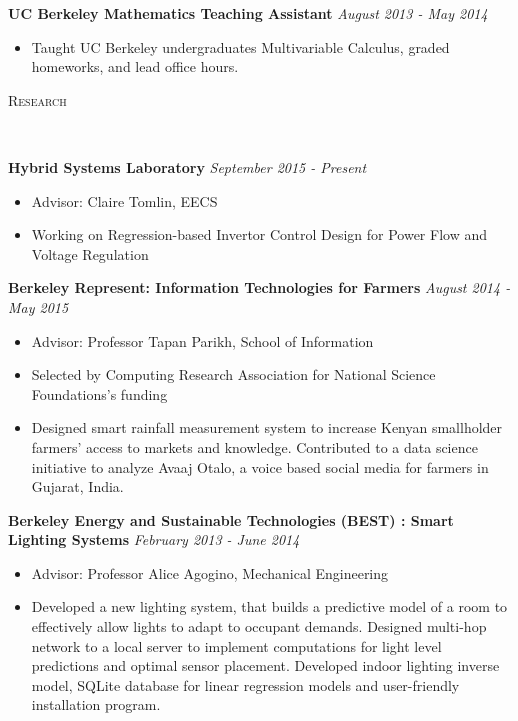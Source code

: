 \documentclass[9pt]{extarticle}
\newenvironment{changemargin}[2]{%
  \begin{list}{}{%
    \setlength{\topsep}{0pt}%
    \setlength{\leftmargin}{#1}%
    \setlength{\rightmargin}{#2}%
    \setlength{\listparindent}{\parindent}%
    \setlength{\itemindent}{\parindent}%
    \setlength{\parsep}{\parskip}%
  }%
  \item[]}{\end{list}
}
\newcommand{\lineover}{
	\begin{changemargin}{-0.05in}{-0.05in}
		\vspace*{-8pt}
		\hrulefill \\
		\vspace*{-2pt}
	\end{changemargin}
}
\newcommand{\header}[1]{
    \vspace{5pt}
	\begin{changemargin}{-0.5in}{-0.5in}
		\scshape{#1}\\
  	\lineover
	\end{changemargin}
	\vspace{5pt}
}
\newenvironment{body} {
	\vspace*{-9pt}
	\begin{changemargin}{-0.5in}{-0.5in}
  }	
	{\end{changemargin}
}
\begin{document}
\begin{body}
	\textbf{UC Berkeley Mathematics Teaching Assistant} 
	 \hfill \emph{August 2013 - May 2014}\\
	\vspace*{-6pt}
	\begin{itemize} \itemsep -0pt  %
		\item[] Taught UC Berkeley undergraduates Multivariable Calculus, graded homeworks, and lead office hours.
	\end{itemize}	
\end{body}

\vspace*{-5pt}
\header{Research}
\begin{body}

\textbf {Hybrid Systems Laboratory} 
\hfill \emph{September 2015 - Present}
\vspace*{-6pt}
\begin{itemize}
	\itemsep -2pt
	\item[] Advisor: Claire Tomlin, EECS 
	\item[]  Working on Regression-based Invertor Control Design for Power Flow and Voltage Regulation
	\end{itemize}

\textbf {Berkeley Represent: Information Technologies for Farmers} 
\hfill \emph{August 2014 - May 2015}
\vspace*{-6pt}
\begin{itemize}
	\itemsep -2pt
	\item[] Advisor: Professor Tapan Parikh, School of Information
	\item[] Selected by Computing Research Association for National Science Foundations's funding
	\item[] Designed smart rainfall measurement system to increase Kenyan smallholder farmers' access to markets and knowledge. Contributed to a data science initiative to analyze Avaaj Otalo, a voice based social media for farmers in Gujarat, India. 
\end{itemize}

\textbf{Berkeley Energy and Sustainable Technologies (BEST) : Smart Lighting Systems}
 \hfill \emph{February 2013  - June 2014}\\
	\vspace*{-6pt}	
	\begin{itemize} \itemsep -0pt  %
	\itemsep -2pt
	\item[] Advisor: Professor Alice Agogino, Mechanical Engineering
		\item[] Developed a new lighting system, that builds a predictive model of a room to effectively allow lights to adapt to occupant demands. Designed multi-hop network to a local server to implement computations for light level predictions and optimal sensor placement. Developed indoor lighting inverse model, SQLite database for linear regression models and user-friendly installation program.
		\end{itemize}
\end{body}
\end{document}
